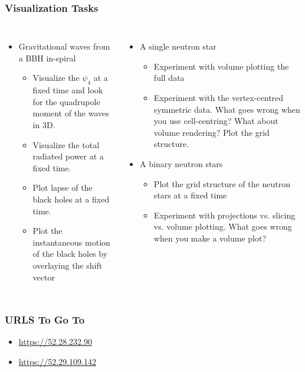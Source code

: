\documentclass[]{beamer}
\begin{document}
\begin{frame}
  \frametitle{Visualization Tasks}
  \begin{columns}
    \column{5cm}
    \begin{itemize}
    \item Gravitational waves from a BBH in-spiral
      \begin{itemize}
      \item Visualize the $\psi_4$ at a fixed time and look for the
        quadrupole moment of the waves in 3D.
      \item Visualize the total radiated power at a fixed time.
      \item Plot lapse of the black holes at a fixed time.
      \item Plot the instantaneous motion of the black holes by
        overlaying the shift vector
      \end{itemize}
    \end{itemize}
    \column{7cm}
    \begin{itemize}
    \item A single neutron star
      \begin{itemize}
      \item Experiment with volume plotting the full data
      \item Experiment with the vertex-centred symmetric data. What
        goes wrong when you use cell-centring? What about volume
        rendering? Plot the grid structure.
      \end{itemize}
    \item A binary neutron stars
      \begin{itemize}
      \item Plot the grid structure of the neutron stars at a fixed
        time
      \item Experiment with projections vs. slicing vs. volume
        plotting. What goes wrong when you make a volume plot?
      \end{itemize}
    \end{itemize}
  \end{columns}
\end{frame}

\begin{frame}
  \frametitle{URLS To Go To}
  \begin{Huge}
  \begin{itemize}
  \item {\color{blue}\url{https://52.28.232.90}}
  \item {\color{blue}\url{https://52.29.109.142}}
  \end{itemize}
\end{Huge}
\end{frame}
\end{document}
